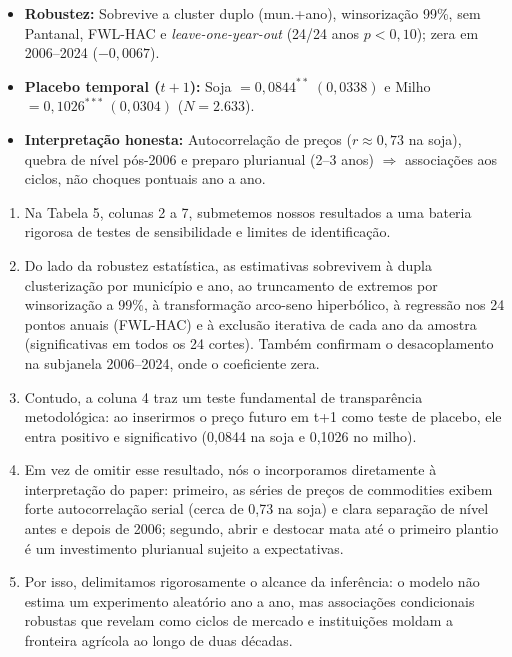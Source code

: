 \documentclass[11pt,a4paper]{article}
\begin{document}
\begin{tcolorbox}[title={\bfseries\small ÂNCORAS EMPÍRICAS E CONCEITUAIS DO SLIDE}]
\begin{itemize}[leftmargin=*,itemsep=1mm,topsep=0.5mm]
    \item \textbf{Robustez:} Sobrevive a cluster duplo (mun.+ano), winsorização 99\%, sem Pantanal, FWL-HAC e \textit{leave-one-year-out} (24/24 anos $p<0{,}10$); zera em 2006--2024 ($-0{,}0067$).
    \item \textbf{Placebo temporal ($t+1$):} Soja $= 0{,}0844^{**}\;(0{,}0338)$ e Milho $= 0{,}1026^{***}\;(0{,}0304)$ ($N=2.633$).
    \item \textbf{Interpretação honesta:} Autocorrelação de preços ($r \approx 0{,}73$ na soja), quebra de nível pós-2006 e preparo plurianual (2--3 anos) $\Rightarrow$ associações aos ciclos, não choques pontuais ano a ano.
\end{itemize}
\end{tcolorbox}
\vspace{2mm}

\vspace{0.8mm}
\begin{enumerate}[leftmargin=*,label=\textbf{(\arabic*)},itemsep=2.8mm,topsep=1mm]
    \item Na Tabela 5, colunas 2 a 7, submetemos nossos resultados a uma bateria rigorosa de testes de sensibilidade e limites de identificação.
    \item Do lado da robustez estatística, as estimativas sobrevivem à dupla clusterização por município e ano, ao truncamento de extremos por winsorização a 99\%, à transformação arco-seno hiperbólico, à regressão nos 24 pontos anuais (FWL-HAC) e à exclusão iterativa de cada ano da amostra (significativas em todos os 24 cortes). Também confirmam o desacoplamento na subjanela 2006–2024, onde o coeficiente zera.
    \item Contudo, a coluna 4 traz um teste fundamental de transparência metodológica: ao inserirmos o preço futuro em t+1 como teste de placebo, ele entra positivo e significativo (0,0844 na soja e 0,1026 no milho).
    \item Em vez de omitir esse resultado, nós o incorporamos diretamente à interpretação do paper: primeiro, as séries de preços de commodities exibem forte autocorrelação serial (cerca de 0,73 na soja) e clara separação de nível antes e depois de 2006; segundo, abrir e destocar mata até o primeiro plantio é um investimento plurianual sujeito a expectativas.
    \item Por isso, delimitamos rigorosamente o alcance da inferência: o modelo não estima um experimento aleatório ano a ano, mas associações condicionais robustas que revelam como ciclos de mercado e instituições moldam a fronteira agrícola ao longo de duas décadas.
\end{enumerate}
\end{document}
